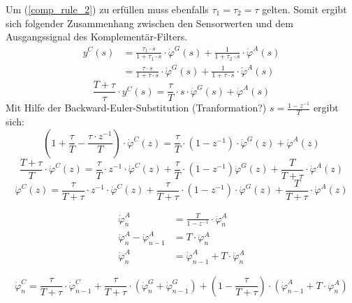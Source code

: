 \documentclass{article}
\begin{document}
Um (\ref{comp_rule_2}) zu erfüllen muss ebenfalls $\tau_1 = \tau_2 = \tau$ gelten. Somit ergibt sich folgender Zusammenhang zwischen den Sensorwerten und dem Ausgangssignal des Komplementär-Filters.
\begin{equation}
\begin{split}
y^C(s) &= \frac{\tau_1 \cdot s}{1 + \tau_1 \cdot s} \cdot \dot{\varphi}^G(s) + \frac{1}{1+\tau_2 \cdot s} \cdot \dot{\varphi}^A(s) \\
&= \frac{\tau \cdot s}{1 + \tau \cdot s} \cdot \dot{\varphi}^G(s) + \frac{1}{1+\tau \cdot s} \cdot \dot{\varphi}^A(s)
\end{split}
\end{equation}
\begin{equation}
\frac{T+\tau}{\tau} \cdot y^C(s) = \frac{\tau}{T} \cdot s \cdot \dot{\varphi}^G(s) + \dot{\varphi}^A(s)
\end{equation}
Mit Hilfe der Backward-Euler-Substitution (Tranformation?) $s = \frac{1-z^{-1}}{T}$ ergibt sich:
\begin{equation}
(1+\frac{\tau}{T}-\frac{\tau \cdot z^{-1}}{T}) \cdot \dot{\varphi}^C(z) = \frac{\tau}{T}\cdot (1-z^{-1}) \cdot \dot{\varphi}^G(z) + \dot{\varphi}^A(z)
\end{equation}
\begin{equation}
\frac{T+\tau}{T} \cdot \dot{\varphi}^C(z) = \frac{\tau}{T} \cdot z^{-1} \cdot \dot{\varphi}^C(z) + \frac{\tau}{T} \cdot (1-z^{-1}) \dot{\varphi}^G(z) + \frac{T}{T+\tau} \cdot \dot{\varphi}^A(z) 
\end{equation}
\begin{equation}
\dot{\varphi}^C(z) = \frac{\tau}{T+\tau} \cdot z^{-1} \cdot \dot{\varphi}^C(z) + \frac{\tau}{T + \tau} \cdot (1 - z^{-1}) \cdot \dot{\varphi}^G(z) + \frac{T}{T+\tau} \cdot \dot{\varphi}^A(z)
\end{equation}

\begin{equation}
\begin{split}
\dot{\varphi}^A_n &= \frac{T}{1-z^{-1}} \cdot \ddot{\varphi}^A_n \\
\dot{\varphi}^A_n - \dot{\varphi}^A_{n-1} &= T \cdot \ddot{\varphi}^A_n \\
\dot{\varphi}^A_n &= \dot{\varphi}^A_{n-1} + T \cdot \ddot{\varphi}^A_n
\end{split}
\end{equation}

\begin{equation}
\dot{\varphi}^C_n = \frac{\tau}{T+\tau} \cdot \dot{\varphi}^C_{n-1} + \frac{\tau}{T + \tau} \cdot (\dot{\varphi}^G_n + \dot{\varphi}^G_{n-1}) + (1 - \frac{\tau}{T + \tau}) \cdot (\dot{\varphi}^A_{n-1} + T \cdot \ddot{\varphi}^A_{n})
\end{equation}
\end{document}
